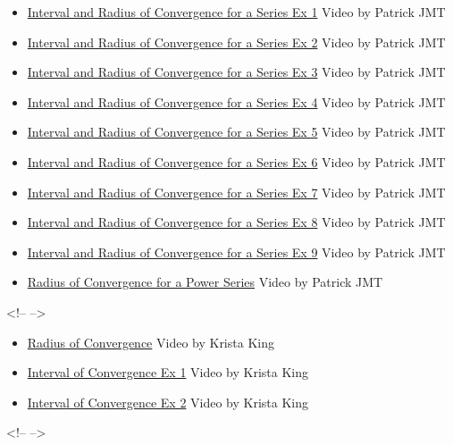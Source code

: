 \begin{itemize}
    \item \href{https://www.youtube.com/watch?v=01LzAU__J-0}{Interval and Radius of Convergence for a Series Ex 1} Video by Patrick JMT
    \item \href{https://www.youtube.com/watch?v=QQBtF7_KJrE}{Interval and Radius of Convergence for a Series Ex 2} Video by Patrick JMT
    \item \href{https://www.youtube.com/watch?v=-gQ2E33V77o}{Interval and Radius of Convergence for a Series Ex 3} Video by Patrick JMT
    \item \href{https://www.youtube.com/watch?v=AZeAZsK0sOw}{Interval and Radius of Convergence for a Series Ex 4} Video by Patrick JMT
    \item \href{https://www.youtube.com/watch?v=uhNQ4X8hXoY}{Interval and Radius of Convergence for a Series Ex 5} Video by Patrick JMT
    \item \href{https://www.youtube.com/watch?v=hLaJU2BLS2Y}{Interval and Radius of Convergence for a Series Ex 6} Video by Patrick JMT
    \item \href{https://www.youtube.com/watch?v=ze54foaEUEQ}{Interval and Radius of Convergence for a Series Ex 7} Video by Patrick JMT
    \item \href{https://www.youtube.com/watch?v=h4CNG3iAxKc}{Interval and Radius of Convergence for a Series Ex 8} Video by Patrick JMT
    \item \href{https://www.youtube.com/watch?v=tcIKlExw-zA}{Interval and Radius of Convergence for a Series Ex 9} Video by Patrick JMT
    \item \href{https://www.youtube.com/watch?v=MM3BXtVu9eM}{Radius of Convergence for a Power Series} Video by Patrick JMT
\end{itemize}

<!-- -->



\begin{itemize}
    \item \href{https://www.youtube.com/watch?v=r8bK9j4vKco}{Radius of Convergence} Video by Krista King
    \item \href{https://www.youtube.com/watch?v=deGN83_kzpc}{Interval of Convergence Ex 1} Video by Krista King
    \item \href{https://www.youtube.com/watch?v=RWTri1aM7rM}{Interval of Convergence Ex 2} Video by Krista King
\end{itemize}

<!-- -->



